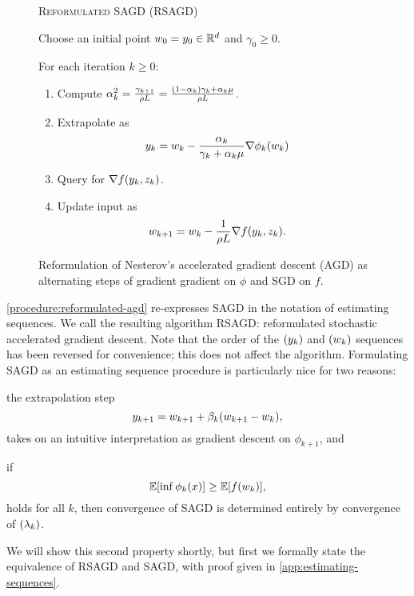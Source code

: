 \begin{figure}[t]
    \centering
    \begin{procedure}{\textsc{Reformulated} \ac{SAGD} (\acs{RSAGD})}
        \item Choose an initial point \( w_0 = y_0 \in \mathbb{R}^d \) and \( \gamma_0 \geq 0 \).
        \item For each iteration \( k \geq 0 \):
            \begin{enumerate}
                \item Compute 
                    \( \alpha^2_k = \frac{\gamma_{k+1}}{\rho L } = \frac{(1-\alpha_k)\gamma_k + \alpha_k \mu}{\rho L} \).
                \item Extrapolate as
                    \[ y_k = w_k - \frac{\alpha_k}{\gamma_k + \alpha_k \mu} \nabla \phi_k(w_k) \]

                \item Query \oracle{} for \( \nabla f(y_k, z_{k}) \). 
                \item Update input as\vspace{-1ex}%
                    \[ w_{k+1} = w_k - \frac{1}{\rho L} \nabla f(y_k, z_{k}). \]
            \end{enumerate}
    \end{procedure}
    \caption{Reformulation of Nesterov's accelerated gradient descent (AGD) as alternating steps of gradient gradient on \( \phi \) and \ac{SGD} on \( f \).}%
    \label{procedure:reformulated-agd}
\end{figure}

\autoref{procedure:reformulated-agd} re-expresses \ac{SAGD} in the notation of estimating sequences.
We call the resulting algorithm \acs{RSAGD}: reformulated stochastic accelerated gradient descent.
Note that the order of the \( \left(y_k\right) \) and \( \left(w_k\right) \) sequences has been reversed for convenience; this does not affect the algorithm.
Formulating \ac{SAGD} as an estimating sequence procedure is particularly nice for two reasons:
\begin{inparaenum}[(1)]
\item the extrapolation step \[ y_{k+1} = w_{k+1} + \beta_k (w_{k+1} - w_k), \] takes on an intuitive interpretation as gradient descent on \( \phi_{k+1} \), and 
\item if \[  \mathbb{E} [\inf \phi_k(x)] \geq \mathbb{E} [f(w_k)], \] holds for all \( k \), then convergence of \ac{SAGD} is determined entirely by convergence of \( \left(\lambda_k\right) \).
\end{inparaenum}
We will show this second property shortly, but first we formally state the equivalence of \ac{RSAGD} and \ac{SAGD}, with proof given in \autoref{app:estimating-sequences}.

